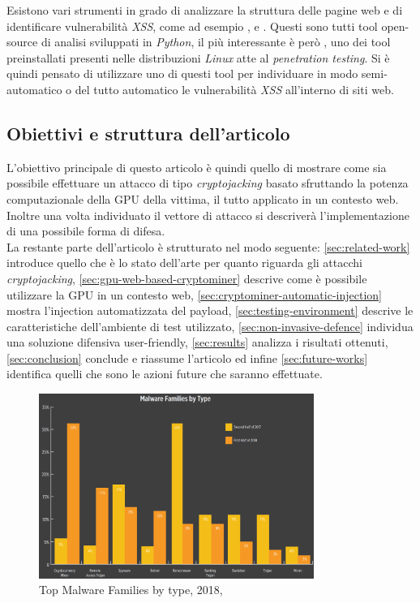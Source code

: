 \documentclass[conference, italian]{IEEEtran}
\newcommand\citetitlen[1]{\citetitle{#1} \citep{#1}}
\begin{document}
Esistono vari strumenti in grado di analizzare la struttura delle pagine web e di identificare vulnerabilità \emph{XSS}, come ad esempio \citetitlen{XSStrike}, \citetitlen{Traxss} e \citetitlen{XSSer}. Questi sono tutti tool open-source di analisi sviluppati in \emph{Python}, il più interessante è però , uno dei tool preinstallati presenti nelle distribuzioni \emph{Linux} atte al \emph{penetration testing}. Si è quindi pensato di utilizzare uno di questi tool per individuare in modo semi-automatico o del tutto automatico le vulnerabilità \emph{XSS} all'interno di siti web.

\subsection{Obiettivi e struttura dell'articolo}\label{subsec:objectives-and-article-structure}
L'obiettivo principale di questo articolo è quindi quello di mostrare come sia possibile effettuare un attacco di tipo \emph{cryptojacking} basato sfruttando la potenza computazionale della GPU della vittima, il tutto applicato in un contesto web. Inoltre una volta individuato il vettore di attacco si descriverà l'implementazione di una possibile forma di difesa.\\
La restante parte dell'articolo è strutturato nel modo seguente:
\cref{sec:related-work} introduce quello che è lo stato dell'arte per quanto riguarda gli attacchi \emph{cryptojacking},
\cref{sec:gpu-web-based-cryptominer} descrive come è possibile utilizzare la GPU in un contesto web,
\cref{sec:cryptominer-automatic-injection} mostra l'injection automatizzata del payload,
\cref{sec:testing-environment} descrive le caratteristiche dell'ambiente di test utilizzato,
\cref{sec:non-invasive-defence} individua una soluzione difensiva user-friendly,
\cref{sec:results} analizza i risultati ottenuti,
\cref{sec:conclusion} conclude e riassume l'articolo ed infine
\cref{sec:future-works} identifica quelli che sono le azioni future che saranno effettuate.


\begin{figure}[hbt!]
\centering
\includegraphics[width=0.8\textwidth]{TopMalwareFamilies.png}
\caption{Top Malware Families by type, 2018, \citetitlen{skyboxtrends}}\label{fig:topmalwarefamilies}
\end{figure}
\end{document}
